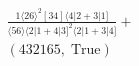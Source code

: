 \documentclass[varwidth, border=5pt]{standalone}
\begin{document}
\begin{my}
$\begin{gathered}
\scriptscriptstyle\frac{1⟨26⟩^2[34]⟨4|2+3|1]}{⟨56⟩⟨2|1+4|3]^2⟨2|1+3|4]}+\\
\scriptscriptstyle(432165,\;\text{True})\phantom{+}
\end{gathered}$
\end{my}
\end{document}
